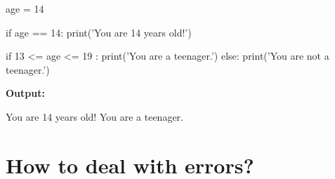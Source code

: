\documentclass[
  american,
  ignorenonframetext,
]{beamer}
\newenvironment{pyexec}[1]{\noindent \textbf{Output: }  #1}{}
\begin{document}
\begin{frame}{}
\protect\hypertarget{section-4}{}

\begin{pythoncode}

age = 14

if age == 14:
    print('You are 14 years old!')

if 13 <= age <= 19 :
    print('You are a teenager.')
else:
    print('You are not a teenager.')

\end{pythoncode}

\begin{pyexec}

\begin{outputcode}

You are 14 years old!
You are a teenager.

\end{outputcode}

\end{pyexec}

\end{frame}

\hypertarget{how-to-deal-with-errors}{%
\section{How to deal with errors?}\label{how-to-deal-with-errors}}
\end{document}
